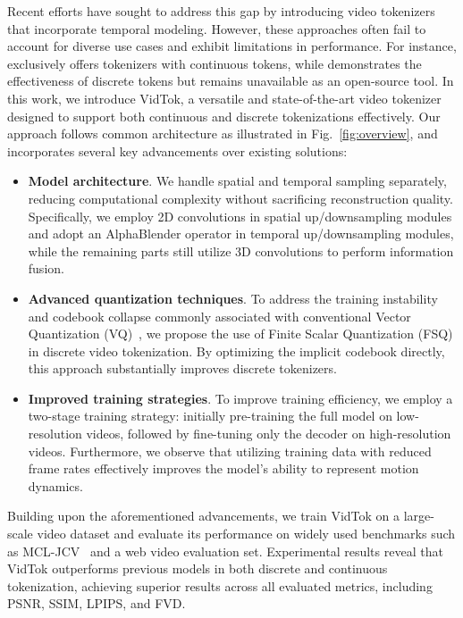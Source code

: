 \documentclass{article} %
\begin{document}
Recent efforts have sought to address this gap by introducing video tokenizers that incorporate temporal modeling. However, these approaches often fail to account for diverse use cases and exhibit limitations in performance. For instance, \citet{yang2024cogvideox} exclusively offers tokenizers with continuous tokens, while \citet{kondratyuk2024videopoet} demonstrates the effectiveness of discrete tokens but remains unavailable as an open-source tool. In this work, we introduce VidTok, a versatile and state-of-the-art video tokenizer designed to support both continuous and discrete tokenizations effectively. Our approach follows common architecture as illustrated in Fig.~\ref{fig:overview}, and incorporates several key advancements over existing solutions:

\begin{itemize}
    \item \textbf{Model architecture}. We handle spatial and temporal sampling separately, reducing computational complexity without sacrificing reconstruction quality. Specifically, we employ 2D convolutions in spatial up/downsampling modules and adopt an AlphaBlender operator in temporal up/downsampling modules, while the remaining parts still utilize 3D convolutions to perform information fusion.
    \item \textbf{Advanced quantization techniques}. To address the training instability and codebook collapse commonly associated with conventional Vector Quantization (VQ)~\citep{van2017neuralvqvae}, we propose the use of Finite Scalar Quantization (FSQ) in discrete video tokenization. By optimizing the implicit codebook directly, this approach substantially improves discrete tokenizers.
    \item \textbf{Improved training strategies}. To improve training efficiency, we employ a two-stage training strategy: initially pre-training the full model on low-resolution videos, followed by fine-tuning only the decoder on high-resolution videos. Furthermore, we observe that utilizing training data with reduced frame rates effectively improves the model's ability to represent motion dynamics.
\end{itemize}

Building upon the aforementioned advancements, we train VidTok on a large-scale video dataset and evaluate its performance on widely used benchmarks such as MCL-JCV~\citep{wang2016mcl} and a web video evaluation set. Experimental results reveal that VidTok outperforms previous models in both discrete and continuous tokenization, achieving superior results across all evaluated metrics, including PSNR, SSIM, LPIPS, and FVD.
\end{document}
